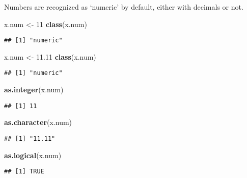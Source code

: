 \documentclass[
  12pt,
]{article}
\newenvironment{Shaded}{\begin{snugshade}}{\end{snugshade}}
\newcommand{\DecValTok}[1]{\textcolor[rgb]{0.00,0.00,0.81}{#1}}
\newcommand{\FloatTok}[1]{\textcolor[rgb]{0.00,0.00,0.81}{#1}}
\newcommand{\FunctionTok}[1]{\textcolor[rgb]{0.13,0.29,0.53}{\textbf{#1}}}
\newcommand{\NormalTok}[1]{#1}
\newcommand{\OtherTok}[1]{\textcolor[rgb]{0.56,0.35,0.01}{#1}}
\begin{document}
Numbers are recognized as `numeric' by default, either with decimals or
not.

\begin{Shaded}
\begin{Highlighting}[]
\NormalTok{x.num }\OtherTok{\textless{}{-}} \DecValTok{11}
\FunctionTok{class}\NormalTok{(x.num)}
\end{Highlighting}
\end{Shaded}

\begin{verbatim}
## [1] "numeric"
\end{verbatim}

\begin{Shaded}
\begin{Highlighting}[]
\NormalTok{x.num }\OtherTok{\textless{}{-}} \FloatTok{11.11}
\FunctionTok{class}\NormalTok{(x.num)}
\end{Highlighting}
\end{Shaded}

\begin{verbatim}
## [1] "numeric"
\end{verbatim}

\begin{Shaded}
\begin{Highlighting}[]
\FunctionTok{as.integer}\NormalTok{(x.num)}
\end{Highlighting}
\end{Shaded}

\begin{verbatim}
## [1] 11
\end{verbatim}

\begin{Shaded}
\begin{Highlighting}[]
\FunctionTok{as.character}\NormalTok{(x.num)}
\end{Highlighting}
\end{Shaded}

\begin{verbatim}
## [1] "11.11"
\end{verbatim}

\begin{Shaded}
\begin{Highlighting}[]
\FunctionTok{as.logical}\NormalTok{(x.num)}
\end{Highlighting}
\end{Shaded}

\begin{verbatim}
## [1] TRUE
\end{verbatim}
\end{document}
